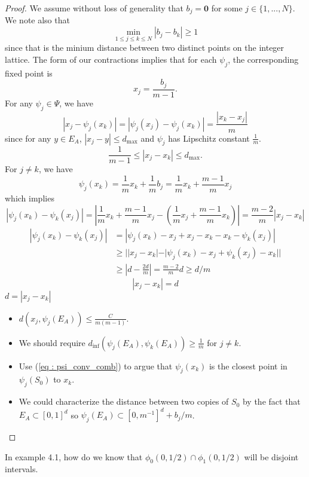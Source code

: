 \documentclass [52pt] {article}
\begin{document}
\begin{proof}
We assume without loss of generality that $b_j = \mathbf{0}$ for some $j\in\{1,...,N\}$.  We note also that 
\[\min_{1\le j\le k\le N}|b_j - b_k| \ge 1\]
since that is the minium distance between two distinct points on the integer lattice.  The form of our contractions implies that for each $\psi_j$, the corresponding fixed point is 
\[x_j = \frac{b_j}{m-1}.\]
For any $\psi_j\in\Psi$, we have
\[|x_j-\psi_j(x_k)|= |\psi_j(x_j) - \psi_j(x_k)| = \frac{|x_k-x_j|}{m}\]
since for any $y\in E_A$, $|x_j-y|\le d_{\max}$ and $\psi_j$ has Lipschitz constant $\frac{1}{m}$.
\[\frac{1}{m-1}\le |x_j-x_k|\le d_{\max}.\]
For $j\not=k$, we have
\begin{equation}\label{eq : psi_conv_comb}
\psi_j(x_k) = \frac{1}{m}x_k+\frac{1}{m}b_j = \frac{1}{m}x_k+\frac{m-1}{m}x_j
\end{equation}
which implies
\[|\psi_j(x_k)-\psi_k(x_j)| = \left|\frac{1}{m}x_k+\frac{m-1}{m}x_j-\left(\frac{1}{m}x_j+\frac{m-1}{m}x_k\right)\right|=\frac{m-2}{m}|x_j-x_k|\]
\[\begin{split}
|\psi_j(x_k) -\psi_k(x_j)|&= |\psi_j(x_k)-x_j+x_j-x_k-x_k-\psi_k(x_j)|\\
&\ge ||x_j-x_k|-|\psi_j(x_k)-x_j +\psi_k(x_j)-x_k||\\
& \ge |d-\frac{2d}{m}| = \frac{m-2}{m}d\ge d/m
\end{split}\]
\[|x_j-x_k|=d\]
$d = |x_j-x_k|$

\begin{itemize}
\item $d(x_j,\psi_j(E_A))\le \frac{C}{m(m-1)}.$
\item We should require $d_{\inf}(\psi_j(E_A),\psi_k(E_A))\ge \frac{1}{m}$ for $j\not= k$.
\item Use (\ref{eq : psi_conv_comb}) to argue that $\psi_j(x_k)$ is the closest point in $\psi_j(S_0)$ to $x_k$.
\item We could characterize the distance between two copies of $S_0$ by the fact that $E_A\subset [0,1]^d$ so $\psi_j(E_A)\subset [0,m^{-1}]^d + b_j/m$.  
\end{itemize}

\end{proof}
In example 4.1, how do we know that $\phi_0(0,1/2)\cap\phi_1(0,1/2)$ will be disjoint intervals.
\\\\
\end{document}

